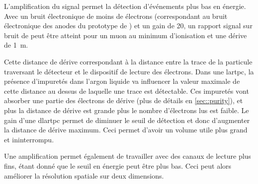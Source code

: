 
      L'amplification du signal permet la détection d'événements plus bas en énergie. Avec un bruit électronique de moins de  électrons (correspondant au bruit électronique des anodes du prototype de \TOO{}) et un gain de 20, un rapport signal sur bruit de  peut être atteint pour un muon au minimum d'ionisation et une dérive de \SI{1}{\meter}.

      Cette distance de dérive correspondant à la distance entre la trace de la particule traversant le détecteur et le dispositif de lecture des électrons. Dans une \gls{lartpc}, la présence d'impuretés dans l'argon liquide va influencer la valeur maximale de cette distance au dessus de laquelle une trace est détectable. Ces impuretés vont absorber une partie des électrons de dérive (plus de détails en \autoref{sec::purity}), et plus la distance de dérive est grande plus le nombre d'électrons lus est faible. Le gain d'une \gls{dlartpc} permet de diminuer le seuil de détection et donc d'augmenter la distance de dérive maximum. Ceci permet d'avoir un volume utile plus grand et ininterrompu.

      Une amplification permet également de travailler avec des canaux de lecture plus fins, étant donné que le seuil en énergie peut être plus bas. Ceci peut alors améliorer la résolution spatiale sur deux dimensions.

